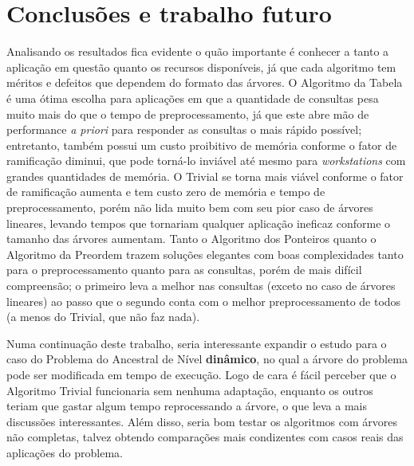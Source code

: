 \section{Conclusões e trabalho futuro}
Analisando os resultados fica evidente o quão importante é conhecer a tanto a aplicação
em questão quanto os recursos disponíveis, já que cada algoritmo tem méritos e defeitos
que dependem do formato das árvores. O Algoritmo da Tabela é uma ótima escolha para
aplicações em que a quantidade de consultas pesa muito mais do que o tempo de
preprocessamento, já que este abre mão de performance \textit{a priori} para responder
as consultas o mais rápido possível; entretanto, também possui um custo proibitivo de
memória conforme o fator de ramificação diminui, que pode torná-lo inviável até mesmo
para \textit{workstations} com grandes quantidades de memória. O Trivial se torna mais
viável conforme o fator de ramificação aumenta e tem custo zero de memória e tempo de
preprocessamento, porém não lida muito bem com seu pior caso de árvores lineares,
levando tempos que tornariam qualquer aplicação ineficaz conforme o tamanho das árvores
aumentam. Tanto o Algoritmo dos Ponteiros quanto o Algoritmo da Preordem trazem soluções
elegantes com boas complexidades tanto para o preprocessamento quanto para as consultas,
porém de mais difícil compreensão; o primeiro leva a melhor nas consultas (exceto no caso
de árvores lineares) ao passo que o segundo conta com o melhor preprocessamento de
todos (a menos do Trivial, que não faz nada).

Numa continuação deste trabalho, seria interessante expandir o estudo para o caso do
Problema do Ancestral de Nível \textbf{dinâmico}, no qual a árvore do problema pode ser
modificada em tempo de execução. Logo de cara é fácil perceber que o Algoritmo Trivial
funcionaria sem nenhuma adaptação, enquanto os outros teriam que gastar algum tempo
reprocessando a árvore, o que leva a mais discussões interessantes. Além disso, seria
bom testar os algoritmos com árvores não completas, talvez obtendo comparações mais
condizentes com casos reais das aplicações do problema.